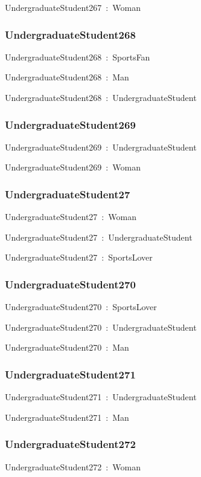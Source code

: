 \documentclass{article}
\begin{document}
UndergraduateStudent267~:~Woman

\subsubsection*{UndergraduateStudent268}

UndergraduateStudent268~:~SportsFan

UndergraduateStudent268~:~Man

UndergraduateStudent268~:~UndergraduateStudent

\subsubsection*{UndergraduateStudent269}

UndergraduateStudent269~:~UndergraduateStudent

UndergraduateStudent269~:~Woman

\subsubsection*{UndergraduateStudent27}

UndergraduateStudent27~:~Woman

UndergraduateStudent27~:~UndergraduateStudent

UndergraduateStudent27~:~SportsLover

\subsubsection*{UndergraduateStudent270}

UndergraduateStudent270~:~SportsLover

UndergraduateStudent270~:~UndergraduateStudent

UndergraduateStudent270~:~Man

\subsubsection*{UndergraduateStudent271}

UndergraduateStudent271~:~UndergraduateStudent

UndergraduateStudent271~:~Man

\subsubsection*{UndergraduateStudent272}

UndergraduateStudent272~:~Woman
\end{document}
